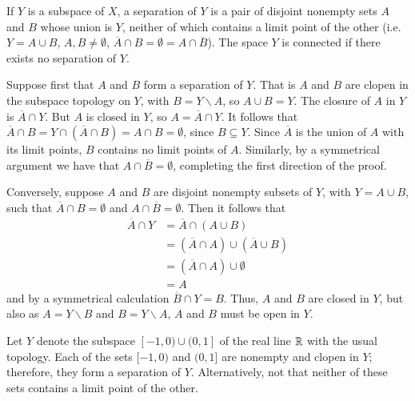 \documentclass[12pt, a4paper, twoside, openright, titlepage]{book}
\begin{document}
\begin{lem}{}{}
    If $Y$ is a subspace of $X$, a separation of $Y$ is a pair of disjoint nonempty sets $A$ and $B$ whose union is $Y$, neither of which contains a limit point of the other (i.e. $Y = A \cup B$, $A,B\neq \emptyset$, $\overline{A}\cap B = \emptyset = A\cap \overline{B}$). The space $Y$ is connected if there exists no separation of $Y$.
\end{lem}
\begin{proof*}{}{}
    Suppose first that $A$ and $B$ form a separation of $Y$. That is $A$ and $B$ are clopen in the subspace topology on $Y$, with $B = Y\backslash A$, so $A \cup B = Y$. The closure of $A$ in $Y$ is $\overline{A} \cap Y$. But $A$ is closed in $Y$, so $A = \overline{A}\cap Y$. It follows that $\overline{A}\cap B = Y\cap (\overline{A}\cap B) = A\cap B = \emptyset$, since $B \subseteq Y$. Since $\overline{A}$ is the union of $A$ with its limit points, $B$ contains no limit points of $A$. Similarly, by a symmetrical argument we have that $A\cap \overline{B} = \emptyset$, completing the first direction of the proof.

    Conversely, suppose $A$ and $B$ are disjoint nonempty subsets of $Y$, with $Y = A\cup B$, such that $\overline{A} \cap B = \emptyset$ and $A\cap \overline{B} = \emptyset$. Then it follows that \begin{align*}
        \overline{A}\cap Y &= \overline{A}\cap (A\cup B) \\
        &= (\overline{A}\cap A)\cup(\overline{A}\cup B) \\
        &= (\overline{A}\cap A)\cup \emptyset \\
        &= A
    \end{align*}
    and by a symmetrical calculation $\overline{B}\cap Y = B$. Thus, $A$ and $B$ are closed in $Y$, but also as $A = Y\backslash B$ and $B = Y\backslash A$, $A$ and $B$ must be open in $Y$.
\end{proof*}

\begin{eg}{}{}
    Let $Y$ denote the subspace $[-1,0)\cup(0,1]$ of the real line $\mathbb R$ with the usual topology. Each of the sets $[-1,0)$ and $(0,1]$ are nonempty and clopen in $Y$; therefore, they form a separation of $Y$. Alternatively, not that neither of these sets contains a limit point of the other.
\end{eg}
\end{document}
